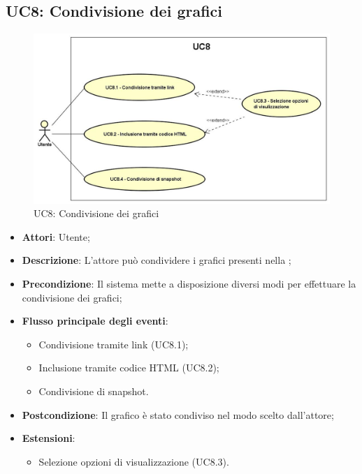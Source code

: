 \subsection{UC8: Condivisione dei grafici}
\begin{figure} [H]
	\centering
	\includegraphics[scale=0.45]{Img/UC8}
	\caption{UC8: Condivisione dei grafici}\label{}
\end{figure}
\begin{itemize}
	\item \textbf{Attori}: Utente;
	\item \textbf{Descrizione}: L'attore può condividere i grafici presenti nella ;
	\item \textbf{Precondizione}: Il sistema mette a disposizione diversi modi per effettuare la condivisione dei grafici;
	\item \textbf{Flusso principale degli eventi}:
	\begin{itemize}
		\item Condivisione tramite link (UC8.1);
		\item Inclusione tramite codice HTML (UC8.2);	
		\item Condivisione di snapshot.
	\end{itemize}
	\item \textbf{Postcondizione}: Il grafico è stato condiviso nel modo scelto dall'attore;
	\item \textbf{Estensioni}:
	\begin{itemize}
		\item Selezione opzioni di visualizzazione (UC8.3).
	\end{itemize}
		
\end{itemize}

